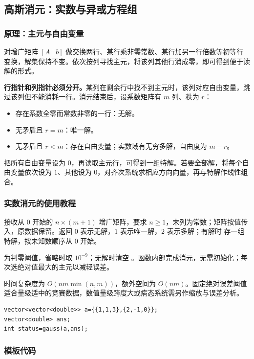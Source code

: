\subsection{高斯消元：实数与异或方程组}
\label{algo:gauss}
\subsubsection*{原理：主元与自由变量}
对增广矩阵 $[A\mid b]$ 做交换两行、某行乘非零常数、某行加另一行倍数等初等行变换，解集保持不变。依次按列寻找主元，将该列其他行消成零，即可得到便于读解的形式。

\textbf{行指针和列指针必须分开。}某列在剩余行中找不到主元时，该列对应自由变量，跳过该列但不能消耗一行。消元结束后，设系数矩阵有 $m$ 列、秩为 $r$：
\begin{itemize}
    \item 存在系数全零而常数非零的一行：无解。
    \item 无矛盾且 $r=m$：唯一解。
    \item 无矛盾且 $r<m$：存在自由变量；实数域有无穷多解，自由度为 $m-r$。
\end{itemize}
把所有自由变量设为 $0$，再读取主元行，可得到一组特解。若要全部解，将每个自由变量依次设为 $1$、其他设为 $0$，对齐次系统求相应方向向量，再与特解作线性组合。

\subsubsection*{实数消元的使用教程}
 接收从 $0$ 开始的 $n\times(m+1)$ 增广矩阵，要求 $n\geq1$，末列为常数；矩阵按值传入，原数据保留。返回 $0$ 表示无解，$1$ 表示唯一解，$2$ 表示多解；有解时  存一组特解，按未知数顺序从 $0$ 开始。

 为判零阈值，省略时取 $10^{-9}$；无解时清空 。函数内部完成消元，无需初始化；每次选绝对值最大的主元以减轻误差。

时间复杂度为 $O(nm\min(n,m))$，额外空间为 $O(nm)$。固定绝对误差阈值适合量级适中的竞赛数据，数值量级跨度大或病态系统需另作缩放与误差分析。
\begin{lstlisting}[style=mtycpp,numbers=none]
vector<vector<double>> a={{1,1,3},{2,-1,0}};
vector<double> ans;
int status=gauss(a,ans);
\end{lstlisting}

\subsubsection*{模板代码}


